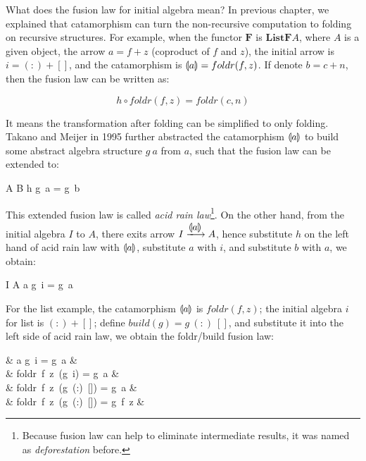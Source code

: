 \documentclass{article}
\begin{document}
What does the fusion law for initial algebra mean? In previous chapter, we explained that catamorphism can turn the non-recursive computation to folding on recursive structures. For example, when the functor $\mathbf{F}$ is $\mathbf{ListF}A$, where $A$ is a given object, the arrow $a = f + z$ (coproduct of $f$ and $z$), the initial arrow is $i = (:) + []$, and the catamorphism is $\llparenthesis a \rrparenthesis = foldr(f, z)$. If denote $b = c + n$, then the fusion law can be written as:

\[
h \circ foldr(f, z) = foldr(c, n)
\]

It means the transformation after folding can be simplified to only folding. Takano and Meijer in 1995 further abstracted the catamorphism $\llparenthesis a \rrparenthesis$ to build some abstract algebra structure $g\ a$ from $a$, such that the fusion law can be extended to\cite{Takano-Meijer-1995}:

\be
A  B \quad \Rightarrow \quad h \circ g\ a = g\ b
\ee

 
This extended fusion law is called {\em acid rain law}\footnote{Because fusion law can help to eliminate intermediate results, it was named as {\em deforestation} before.}. On the other hand, from the initial algebra $I$ to $A$, there exits arrow $I \arrowto{\lbb a \rbb} A$, hence substitute $h$ on the left hand of acid rain law with $\llparenthesis a \rrparenthesis$, substitute $a$ with $i$, and substitute $b$ with $a$, we obtain:

\be
I  A \quad \Rightarrow \quad \lbb a \rbb \circ g\ i = g\ a
\ee

For the list example, the catamorphism $\llparenthesis a \rrparenthesis$ is $foldr(f, z)$; the initial algebra $i$ for list is $(:) + []$; define $build(g) = g\ (:)\ []$, and substitute it into the left side of acid rain law, we obtain the foldr/build fusion law:

\blre
& \lbb a \rbb \circ g\ i = g\ a &  \\

\Rightarrow &
foldr\ f\ z\ (g\ i) = g\ a &  \\

\Rightarrow &
foldr\ f\ z\ (g\ (:)\ []) = g\ a &  \\

\Rightarrow &
foldr\ f\ z\ (g\ (:)\ []) = g\ f\ z &  \\
\end{document}
